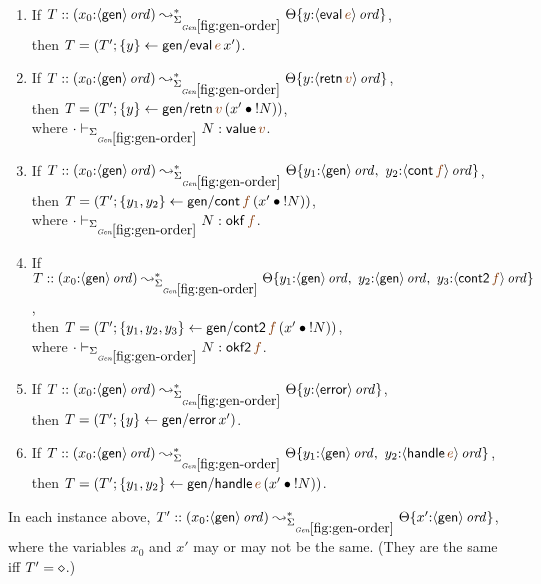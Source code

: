 \bigskip
\begin{lemma}~
\begin{enumerate}
\item If 
   $T :: (x_0{:}\istrue{\susp{\sf gen}}) \leadsto^*_{\siggenorder}
         \tackon{\Theta}{y{:}\istrue{\susp{{\sf eval}\,\lf{e}}}}$,
\\ then 
   $T = \left(T'; \trstep{y}{{\sf gen/eval}\,\lf{e}\,x'}\right)$.
\medskip
\item If 
   $T :: (x_0{:}\istrue{\susp{\sf gen}}) \leadsto^*_{\siggenorder}
         \tackon{\Theta}{y{:}\istrue{\susp{{\sf retn}\,\lf{v}}}}$,
\\ then 
   $T = \left(T'; \trstep{y}{{\sf gen/retn}\,\lf{v}\,(\tfuser{x'}{\tbangr{N}})}\right)$,
\\ where 
   $\cdot \vdash_{\siggenorder} N : {{{\sf value}\,\lf{v}}}$.
\medskip
\item If 
   $T :: (x_0{:}\istrue{\susp{\sf gen}}) \leadsto^*_{\siggenorder}
         \tackon{\Theta}{y_1{:}\istrue{\susp{{\sf gen}}}, ~
                         y_2{:}\istrue{\susp{{\sf cont}\,\lf{f}}}}$,
\\ then 
   $T = \left(T'; \trstep{y_1,y_2}{{\sf gen/cont}\,\lf{f}\,(\tfuser{x'}{\tbangr{N}})}\right)$,
\\ where 
   $\cdot \vdash_{\siggenorder} N : {{{\sf okf}\,\lf{f}}}$.
\medskip
\item If
   $T :: (x_0{:}\istrue{\susp{\sf gen}}) \leadsto^*_{\siggenorder}
         \tackon{\Theta}{y_1{:}\istrue{\susp{{\sf gen}}}, ~
                         y_2{:}\istrue{\susp{{\sf gen}}}, ~
                         y_3{:}\istrue{\susp{{\sf cont2}\,\lf{f}}}}$,
\\ then 
   $T = \left(T'; \trstep{y_1,y_2,y_3}{{\sf gen/cont2}\,\lf{f}\,(\tfuser{x'}{\tbangr{N}})}\right)$,
\\ where 
   $\cdot \vdash_{\siggenorder} N : {{{\sf okf2}\,\lf{f}}}$.
\medskip
\item If 
   $T :: (x_0{:}\istrue{\susp{\sf gen}}) \leadsto^*_{\siggenorder}
         \tackon{\Theta}{y{:}\istrue{\susp{{\sf error}}}}$,
\\ then 
   $T = \left(T'; \{{y}\} \leftarrow {{\sf gen/error}\,x'}\right)$.
\medskip
\item If 
   $T :: (x_0{:}\istrue{\susp{\sf gen}}) \leadsto^*_{\siggenorder}
         \tackon{\Theta}{y_1{:}\istrue{\susp{{\sf gen}}}, ~
                         y_2{:}\istrue{\susp{{\sf handle}\,\lf{e}}}}$,
\\ then 
   $T = \left(T'; \trstep{y_1,y_2}{{\sf gen/handle}\,\lf{e}\,(\tfuser{x'}{\tbangr{N}})}\right)$.
\medskip
\end{enumerate}
In each instance above, 
$T' :: (x_0{:}\istrue{\susp{\sf gen}}) \leadsto^*_{\siggenorder}
          \tackon{\Theta}{x'{:}\istrue{\susp{{\sf gen}}}}$,
where the variables $x_0$ and $x'$ may or may not
be the same. (They are the same iff $T' = \diamond$.)
\end{lemma}

